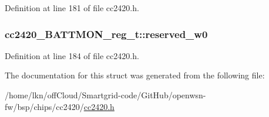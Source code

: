 Definition at line 181 of file cc2420.\+h.

\subsubsection[{\texorpdfstring{reserved\+\_\+w0}{reserved_w0}}]{ cc2420\+\_\+\+B\+A\+T\+T\+M\+O\+N\+\_\+reg\+\_\+t\+::reserved\+\_\+w0}\hypertarget{structcc2420___b_a_t_t_m_o_n__reg__t_aa857d1dee55fa0e97bcd2be25bb4550c}{}\label{structcc2420___b_a_t_t_m_o_n__reg__t_aa857d1dee55fa0e97bcd2be25bb4550c}


Definition at line 184 of file cc2420.\+h.



The documentation for this struct was generated from the following file\+:\begin{DoxyCompactItemize}
\item 
/home/lkn/off\+Cloud/\+Smartgrid-\/code/\+Git\+Hub/openwsn-\/fw/bsp/chips/cc2420/\hyperlink{cc2420_8h}{cc2420.\+h}\end{DoxyCompactItemize}
